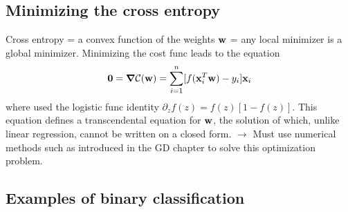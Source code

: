 \documentclass[norsk,a4paper,11pt]{article}
\begin{document}
\subsection{Minimizing the cross entropy}
Cross entropy = a convex function of the weights $\text{\textbf{w}}$ = any local minimizer is a global minimizer. Minimizing the cost func leads to the equation
\begin{align}
	\bm{0} = \bm{\nabla} \mathcal{C} (\text{\textbf{w}}) = \sum_{i=1}^n [f(\text{\textbf{x}}_i^T \text{\textbf{w}}) - y_i] \text{\textbf{x}}_i
\end{align}
where used the logistic func identity $\partial_z f(z) = f(z)[1 - f(z)]$. This equation defines a transcendental equation for $\text{\textbf{w}}$, the solution of which, unlike linear regression, cannot be written on a closed form. $\rightarrow$ Must use numerical methods such as introduced in the GD chapter to solve this optimization problem.

\subsection{Examples of binary classification}
\end{document}
